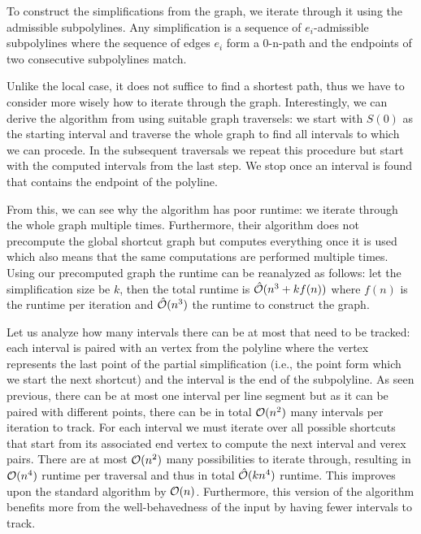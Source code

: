 To construct the simplifications from the graph, we iterate through it using the admissible subpolylines. Any simplification is a sequence of \(e_i\)-admissible subpolylines where the sequence of edges \(e_i\) form a 0-n-path and the endpoints of two consecutive subpolylines match.

Unlike the local case, it does not suffice to find a shortest path, thus we have to consider more wisely how to iterate through the graph. Interestingly, we can derive the algorithm from \citeauthor{on_optimal_polyline_simplification_using_the_hausdorff_and_frechet_distance} using suitable graph traversels: we start with \(S(0)\) as the starting interval and traverse the whole graph to find all intervals to which we can procede. In the subsequent traversals we repeat this procedure but start with the computed intervals from the last step. We stop once an interval is found that contains the endpoint of the polyline.

From this, we can see why the \citeauthor{on_optimal_polyline_simplification_using_the_hausdorff_and_frechet_distance} algorithm has poor runtime: we iterate through the whole graph multiple times. Furthermore, their algorithm does not precompute the global shortcut graph but computes everything once it is used which also means that the same computations are performed multiple times. Using our precomputed graph the runtime can be reanalyzed as follows: let the simplification size be \(k\), then the total runtime is \(\hat{\mathcal{O}}(n^3 + kf(n))\) where \(f(n)\) is the runtime per iteration and \(\hat{\mathcal{O}}(n^3)\) the runtime to construct the graph.

Let us analyze how many intervals there can be at most that need to be tracked: each interval is paired with an vertex from the polyline where the vertex represents the last point of the partial simplification (i.e., the point form which we start the next shortcut) and the interval is the end of the subpolyline. As seen previous, there can be at most one interval per line segment but as it can be paired with different points, there can be in total \(\mathcal{O}(n^2)\) many intervals per iteration to track. For each interval we must iterate over all possible shortcuts that start from its associated end vertex to compute the next interval and verex pairs. There are at most \(\mathcal{O}(n^2)\) many possibilities to iterate through, resulting in \(\mathcal{O}(n^4)\) runtime per traversal and thus in total \(\hat{\mathcal{O}}(kn^4)\) runtime. This improves upon the standard algorithm by \(\mathcal{O}(n)\). Furthermore, this version of the algorithm benefits more from the well-behavedness of the input by having fewer intervals to track.

